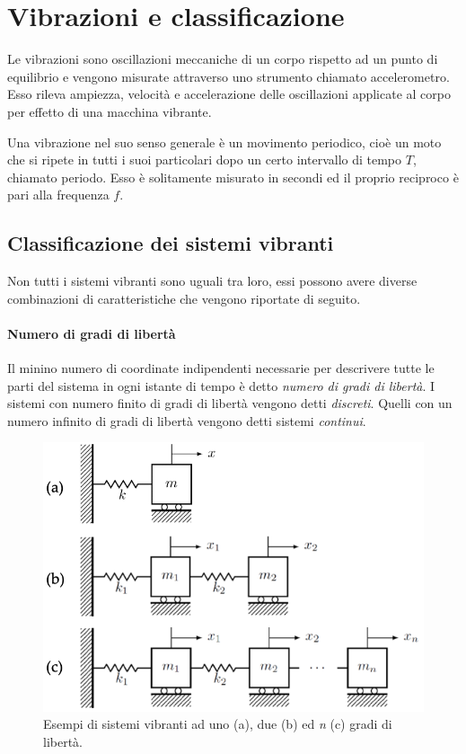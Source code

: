 \section{Vibrazioni e classificazione}
Le vibrazioni sono oscillazioni meccaniche di un corpo rispetto ad un punto di equilibrio e vengono misurate attraverso uno strumento chiamato accelerometro. 
Esso rileva ampiezza, velocità e accelerazione delle oscillazioni applicate al corpo per effetto di una macchina vibrante.

Una vibrazione nel suo senso generale è un movimento periodico, cioè un moto che si ripete in tutti i suoi particolari dopo un certo intervallo di tempo $T$, chiamato periodo. Esso è solitamente misurato in secondi ed il proprio reciproco è pari alla frequenza $f$.

\subsection{Classificazione dei sistemi vibranti}
Non tutti i sistemi vibranti sono uguali tra loro, essi possono avere diverse combinazioni di caratteristiche che vengono riportate di seguito.
\paragraph{Numero di gradi di libertà} Il minino numero di coordinate indipendenti necessarie per descrivere tutte le parti del sistema in ogni istante di tempo è detto \textit{numero di gradi di libertà}. I sistemi con numero finito di gradi di libertà vengono detti \textit{discreti}. Quelli con un numero infinito di gradi di libertà vengono detti sistemi \textit{continui}.
\begin{figure}[h]
    \centering
    \includegraphics[scale=0.5]{GradiDiLibertà.png}
    \caption{Esempi di sistemi vibranti ad uno (a), due (b) ed \textit{n} (c) gradi di libertà.}
    \label{GradiDiLibertà}
\end{figure}
